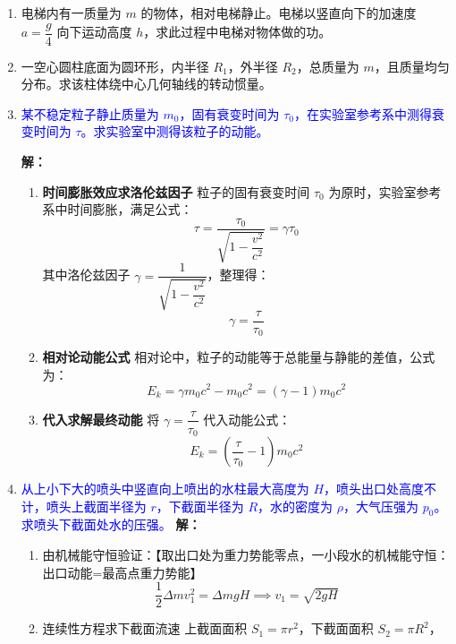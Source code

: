 \documentclass[11pt,a4paper]{article}
\begin{document}
\begin{enumerate}
重力势能变化量应当考虑x-$x_0$,而不是x
    \[
E_k = \frac{1}{2}mv_0^2 + mgx\sin\theta - \frac{1}{2}kx^2 - \frac{(mg\sin\theta)^2}{2k}
\]
\item 电梯内有一质量为 \( m \) 的物体，相对电梯静止。电梯以竖直向下的加速度 \( a = \dfrac{g}{4} \) 向下运动高度 \( h \)，求此过程中电梯对物体做的功。

    \item 一空心圆柱底面为圆环形，内半径 \( R_1 \)，外半径 \( R_2 \)，总质量为 \( m \)，且质量均匀分布。求该柱体绕中心几何轴线的转动惯量。

    \item \textcolor{blue}{某不稳定粒子静止质量为 \( m_0 \)，固有衰变时间为 \( \tau_0 \)，在实验室参考系中测得衰变时间为 \( \tau \)。求实验室中测得该粒子的动能。}

\vspace{0.5em}
\textbf{解：}
\begin{enumerate}
    \item \textbf{时间膨胀效应求洛伦兹因子}
    粒子的固有衰变时间 \( \tau_0 \) 为原时，实验室参考系中时间膨胀，满足公式：
    \[
    \tau = \frac{\tau_0}{\sqrt{1-\dfrac{v^2}{c^2}}} = \gamma \tau_0
    \]
    其中洛伦兹因子 \( \gamma = \dfrac{1}{\sqrt{1-\dfrac{v^2}{c^2}}} \)，整理得：
    \[
    \gamma = \frac{\tau}{\tau_0}
    \]

    \item \textbf{相对论动能公式}
    相对论中，粒子的动能等于总能量与静能的差值，公式为：
    \[
    E_k = \gamma m_0 c^2 - m_0 c^2 = (\gamma - 1) m_0 c^2
    \]

    \item \textbf{代入求解最终动能}
    将 \( \gamma = \dfrac{\tau}{\tau_0} \) 代入动能公式：
    \[
    E_k = \left( \frac{\tau}{\tau_0} - 1 \right) m_0 c^2
    \]
\end{enumerate}
    \item \textcolor{blue}{从上小下大的喷头中竖直向上喷出的水柱最大高度为 \( H \)，喷头出口处高度不计，喷头上截面半径为 \( r \)，下截面半径为 \( R \)，水的密度为 \( \rho \)，大气压强为 \( p_0 \)。求喷头下截面处水的压强。}
\textbf{解：}
\begin{enumerate}
    \item 由机械能守恒验证：【取出口处为重力势能零点，一小段水的机械能守恒：出口动能=最高点重力势能】
    \[
    \frac{1}{2}\Delta m v_1^2 = \Delta m g H \implies v_1 = \sqrt{2gH}
    \]

    \item 连续性方程求下截面流速
    上截面面积 \( S_1 = \pi r^2 \)，下截面面积 \( S_2 = \pi R^2 \)，
    

\end{enumerate}
\end{enumerate}
\end{document}
